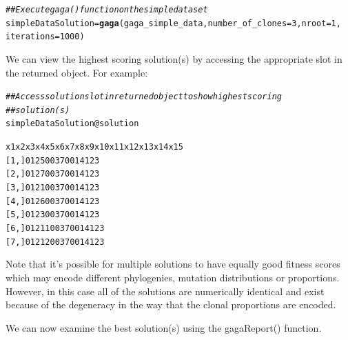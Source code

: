 \documentclass[a4paper]{article}\usepackage[]{graphicx}\usepackage[]{color}
\makeatletter
\newcommand{\hlnum}[1]{\textcolor[rgb]{0.686,0.059,0.569}{#1}}%
\newcommand{\hlcom}[1]{\textcolor[rgb]{0.678,0.584,0.686}{\textit{#1}}}%
\newcommand{\hlopt}[1]{\textcolor[rgb]{0,0,0}{#1}}%
\newcommand{\hlstd}[1]{\textcolor[rgb]{0.345,0.345,0.345}{#1}}%
\newcommand{\hlkwb}[1]{\textcolor[rgb]{0.69,0.353,0.396}{#1}}%
\newcommand{\hlkwc}[1]{\textcolor[rgb]{0.333,0.667,0.333}{#1}}%
\newcommand{\hlkwd}[1]{\textcolor[rgb]{0.737,0.353,0.396}{\textbf{#1}}}%
\newenvironment{kframe}{%
 \def\at@end@of@kframe{}%
 \ifinner\ifhmode%
  \def\at@end@of@kframe{\end{minipage}}%
  \begin{minipage}{\columnwidth}%
 \fi\fi%
 \def\FrameCommand##1{\hskip\@totalleftmargin \hskip-\fboxsep
 \colorbox{shadecolor}{##1}\hskip-\fboxsep
     \hskip-\linewidth \hskip-\@totalleftmargin \hskip\columnwidth}%
 \MakeFramed {\advance\hsize-\width
   \@totalleftmargin\z@ \linewidth\hsize
   \@setminipage}}%
 {\par\unskip\endMakeFramed%
 \at@end@of@kframe}
\newenvironment{knitrout}{}{} %
\makeatother
\begin{document}
\begin{knitrout}
\color{fgcolor}\begin{kframe}
\begin{alltt}
\hlcom{## Execute gaga() function on the simple data set}
\hlstd{simpleDataSolution} \hlkwb{=} \hlkwd{gaga}\hlstd{(gaga_simple_data,} \hlkwc{number_of_clones} \hlstd{=} \hlnum{3}\hlstd{,} \hlkwc{nroot} \hlstd{=} \hlnum{1}\hlstd{,}
    \hlkwc{iterations} \hlstd{=} \hlnum{1000}\hlstd{)}
\end{alltt}
\end{kframe}
\end{knitrout}


We can view the highest scoring solution(s) by accessing the appropriate slot in the returned object.  For example:

\begin{knitrout}
\color{fgcolor}\begin{kframe}
\begin{alltt}
\hlcom{## Access solution slot in returned object to show highest scoring}
\hlcom{## solution(s)}
\hlstd{simpleDataSolution}\hlopt{@}\hlkwc{solution}
\end{alltt}
\end{kframe}
\end{knitrout}

\begin{alltt}
     x1 x2 x3 x4 x5 x6 x7 x8 x9 x10 x11 x12 x13 x14 x15
[1,]  0  1  2  5  0  0  3  7  0   0   1   4   1   2   3
[2,]  0  1  2  7  0  0  3  7  0   0   1   4   1   2   3
[3,]  0  1  2  1  0  0  3  7  0   0   1   4   1   2   3
[4,]  0  1  2  6  0  0  3  7  0   0   1   4   1   2   3
[5,]  0  1  2  3  0  0  3  7  0   0   1   4   1   2   3
[6,]  0  1  2 11  0  0  3  7  0   0   1   4   1   2   3
[7,]  0  1  2 12  0  0  3  7  0   0   1   4   1   2   3
\end{alltt}

Note that it's possible for multiple solutions to have equally good fitness scores which may encode different phylogenies, mutation distributions or proportions.  However, in this case all of the solutions are numerically identical and exist because of the degeneracy in the way that the clonal proportions are encoded.

We can now examine the best solution(s) using the gagaReport() function.  
\end{document}
